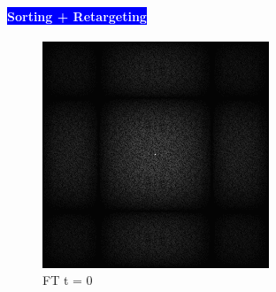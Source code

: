 \begin{figure}[H]
\begin{tcolorbox}[boxrule=4pt,sharp corners=downhill,title=Bedeutung des Retargeting]
    \paragraph{\hfill\colorbox{blue}{\textcolor{white}{Sorting + Retargeting}}}
    \centering
    \begin{subfigure}[b]{0.2\linewidth}
        \includegraphics[width=\linewidth]{content/TemporalerAlg/Bilder/Retargeting/Bedeutung Retargeting/Sorting_Small_Block_WithRetargeting/Spektrum/Ausschnitt1.png}
         \caption{FT t = 0}
         \label{pic:retarget_t0}
    \end{subfigure}
    \begin{subfigure}[b]{0.2\linewidth}

\end{subfigure}
\end{tcolorbox}
\end{figure}
